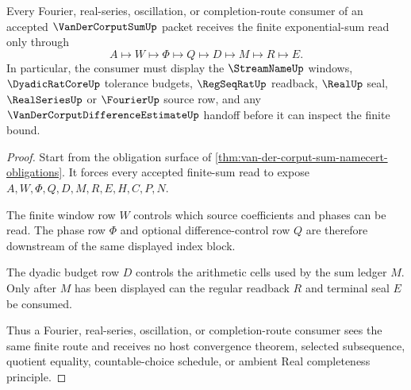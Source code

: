 \begin{theorem}
\label{thm:van-der-corput-sum-finite-route}
Every Fourier, real-series, oscillation, or completion-route consumer of an accepted $\VanDerCorputSumUp$ packet receives the finite exponential-sum read only through
$$
A\longmapsto W\longmapsto \Phi\longmapsto Q\longmapsto D\longmapsto M\longmapsto R\longmapsto E .
$$
In particular, the consumer must display the $\StreamNameUp$ windows, $\DyadicRatCoreUp$ tolerance budgets, $\RegSeqRatUp$ readback, $\RealUp$ seal, $\RealSeriesUp$ or $\FourierUp$ source row, and any $\VanDerCorputDifferenceEstimateUp$ handoff before it can inspect the finite bound.
\end{theorem}
\begin{proof}
Start from the obligation surface of \autoref{thm:van-der-corput-sum-namecert-obligations}. It forces every accepted finite-sum read to expose $A,W,\Phi,Q,D,M,R,E,H,C,P,N$.

The finite window row $W$ controls which source coefficients and phases can be read. The phase row $\Phi$ and optional difference-control row $Q$ are therefore downstream of the same displayed index block.

The dyadic budget row $D$ controls the arithmetic cells used by the sum ledger $M$. Only after $M$ has been displayed can the regular readback $R$ and terminal seal $E$ be consumed.

Thus a Fourier, real-series, oscillation, or completion-route consumer sees the same finite route and receives no host convergence theorem, selected subsequence, quotient equality, countable-choice schedule, or ambient Real completeness principle.
\end{proof}



